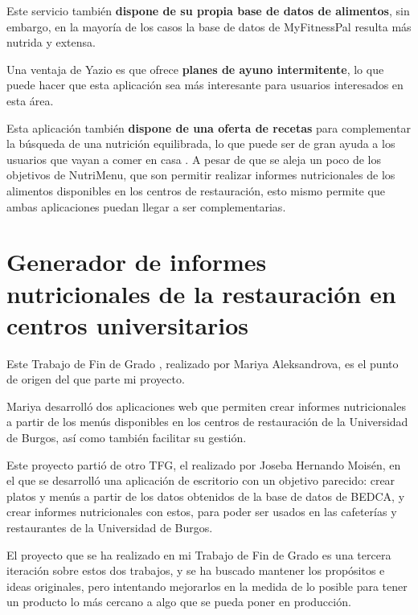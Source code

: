 Este servicio también \textbf{dispone de su propia base de datos de alimentos}, sin embargo, en la mayoría de los casos la base de datos de MyFitnessPal resulta más nutrida y extensa.

Una ventaja de Yazio es que ofrece \textbf{planes de ayuno intermitente}, lo que puede hacer que esta aplicación sea más interesante para usuarios interesados en esta área.

Esta aplicación también \textbf{dispone de una oferta de recetas} para complementar la búsqueda de una nutrición equilibrada, lo que puede ser de gran ayuda a los usuarios que vayan a comer en casa \cite{yazio:main}. A pesar de que se aleja un poco de los objetivos de NutriMenu, que son permitir realizar informes nutricionales de los alimentos disponibles en los centros de restauración, esto mismo permite que ambas aplicaciones puedan llegar a ser complementarias.

\section{Generador de informes nutricionales de la restauración en centros universitarios}

Este Trabajo de Fin de Grado \cite{tfg-mariya:memoria}, realizado por Mariya Aleksandrova, es el punto de origen del que parte mi proyecto. 

Mariya desarrolló dos aplicaciones web que permiten crear informes nutricionales a partir de los menús disponibles en los centros de restauración de la Universidad de Burgos, así como también facilitar su gestión.

Este proyecto partió de otro TFG, el realizado por Joseba Hernando Moisén, en el que se desarrolló una aplicación de escritorio con un objetivo parecido: crear platos y menús a partir de los datos obtenidos de la base de datos de BEDCA, y crear informes nutricionales con estos, para poder ser usados en las cafeterías y restaurantes de la Universidad de Burgos.

El proyecto que se ha realizado en mi Trabajo de Fin de Grado es una tercera iteración sobre estos dos trabajos, y se ha buscado mantener los propósitos e ideas originales, pero intentando mejorarlos en la medida de lo posible para tener un producto lo más cercano a algo que se pueda poner en producción.